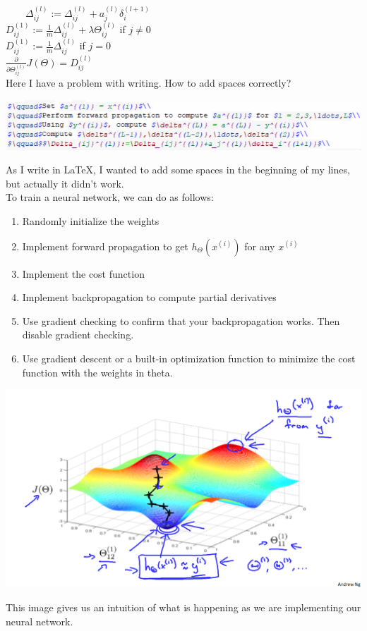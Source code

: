 \documentclass{article}
\begin{document}
$\qquad$$\Delta_{ij}^{(l)}:=\Delta_{ij}^{(l)}+a_j^{(l)}\delta_i^{(l+1)}$\\
$D_{ij}^{(1)}:=\frac{1}{m}\Delta_{ij}^{(l)}+\lambda\Theta_{ij}^{(l)}$ if $j\neq0$\\
$D_{ij}^{(1)}:=\frac{1}{m}\Delta_{ij}^{(l)}$ if $j=0$\\
$\frac{\partial}{\partial\Theta_{ij}^{(l)}}J(\Theta) = D_{ij}^{(l)}$\\
Here I have a problem with writing. How to add spaces correctly?
\begin{center}
\includegraphics[scale=0.4]{2.png}
\end{center}
As I write in \LaTeX, I wanted to add some spaces in the beginning of my lines, but actually it didn't work.\\
To train a neural network, we can do as follows:
\begin{enumerate}
  \item Randomly initialize the weights
  \item Implement forward propagation to get $h_{\Theta}(x^{(i)})$ for any $x^{(i)}$
  \item Implement the cost function
  \item Implement backpropagation to compute partial derivatives
  \item Use gradient checking to confirm that your backpropagation works. Then disable gradient checking.
  \item Use gradient descent or a built-in optimization function to minimize the cost function with the weights in theta.
\end{enumerate}
\begin{center}
\includegraphics[scale=0.6]{3.png}
\end{center}
This image gives us an intuition of what is happening as we are implementing our neural network.
\end{document}
